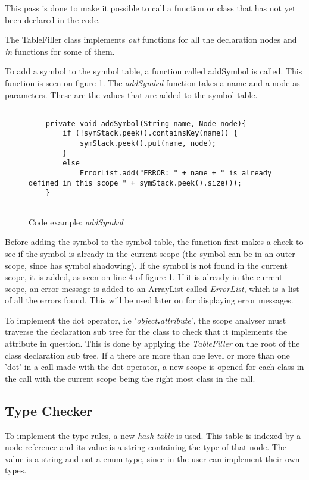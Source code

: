 This pass is done to make it possible to call a function or class that has not yet been declared in the code.

The TableFiller class implements \textit{out} functions for all the declaration nodes and \textit{in} functions for some of them.

To add a symbol to the symbol table, a function called addSymbol is called. This function is seen on figure \ref{fig:addsymbol}. The \textit{addSymbol} function takes a name and a node as parameters. These are the values that are added to the symbol table.

\begin{figure}[H]
\centering
\begin{lstlisting}[]

    private void addSymbol(String name, Node node){
        if (!symStack.peek().containsKey(name)) {
            symStack.peek().put(name, node);
        }
        else
            ErrorList.add("ERROR: " + name + " is already defined in this scope " + symStack.peek().size());
    }
    
\end{lstlisting}
\caption{Code example: \textit{addSymbol}}
\label{fig:addsymbol}
\end{figure}

Before adding the symbol to the symbol table, the function first makes a check to see if the symbol is already in the current scope (the symbol can be in an outer scope, since \lang{} has symbol shadowing). If the symbol is not found in the current scope, it is added, as seen on line 4 of figure \ref{fig:addsymbol}. If it is already in the current scope, an error message is added to an ArrayList called \textit{ErrorList}, which is a list of all the errors found. This will be used later on for displaying error messages.

To implement the dot operator, i.e '\textit{object\textbf{.}attribute}', the scope analyser must traverse the declaration sub tree for the class to check that it implements the attribute in question. This is done by applying the \textit{TableFiller} on the root of the class declaration sub tree. If a there are more than one level or more than one 'dot' in a call made with the dot operator, a new scope is opened for each class in the call with the current scope being the right most class in the call.



\subsection{Type Checker}
To implement the type rules, a new \textit{hash table} is used. This table is indexed by a node reference and its value is a string containing the type of that node. The value is a string and not a enum type, since in \lang{} the user can implement their own types. 

